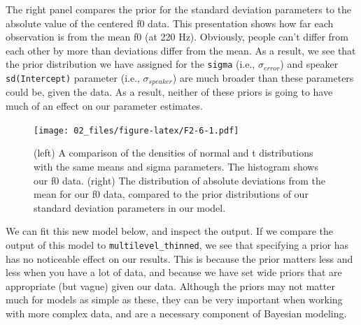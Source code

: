 \documentclass[
]{book}
\begin{document}
The right panel compares the prior for the standard deviation parameters to the absolute value of the centered f0 data. This presentation shows how far each observation is from the mean f0 (at 220 Hz). Obviously, people can't differ from each other by more than deviations differ from the mean. As a result, we see that the prior distribution we have assigned for the \texttt{sigma} (i.e., \(\sigma_{error}\)) and speaker \texttt{sd(Intercept)} parameter (i.e., \(\sigma_{speaker}\)) are much broader than these parameters could be, given the data. As a result, neither of these priors is going to have much of an effect on our parameter estimates.

\begin{figure}
\centering
\texttt{[image: 02\_files/figure-latex/F2-6-1.pdf]}
\caption{\label{fig:F2-6}(left) A comparison of the densities of normal and t distributions with the same means and sigma parameters. The histogram shows our f0 data. (right) The distribution of absolute deviations from the mean for our f0 data, compared to the prior distributions of our standard deviation parameters in our model.}
\end{figure}

We can fit this new model below, and inspect the output. If we compare the output of this model to \texttt{multilevel\_thinned}, we see that specifying a prior has has no noticeable effect on our results. This is because the prior matters less and less when you have a lot of data, and because we have set wide priors that are appropriate (but vague) given our data. Although the priors may not matter much for models as simple as these, they can be very important when working with more complex data, and are a necessary component of Bayesian modeling.
\end{document}
